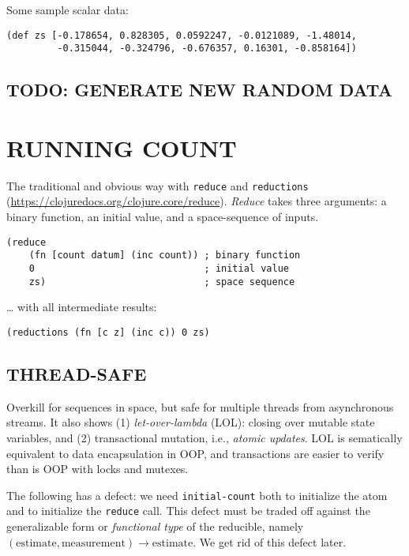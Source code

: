 \documentclass[10pt,oneside,x11names]{article}
\begin{document}
Some sample scalar data:

\begin{verbatim}
(def zs [-0.178654, 0.828305, 0.0592247, -0.0121089, -1.48014,
         -0.315044, -0.324796, -0.676357, 0.16301, -0.858164])
\end{verbatim}

\subsection{TODO: GENERATE NEW RANDOM DATA}
\label{sec:org0cce010}

\section{RUNNING COUNT}
\label{running-count}
The traditional and obvious way with \texttt{reduce} and \texttt{reductions}
(\url{https://clojuredocs.org/clojure.core/reduce}). \emph{Reduce} takes three
arguments: a binary function, an initial value, and a space-sequence of
inputs.

\begin{verbatim}
(reduce
    (fn [count datum] (inc count)) ; binary function
    0                              ; initial value
    zs)                            ; space sequence
\end{verbatim}

\ldots{} with all intermediate results:

\begin{verbatim}
(reductions (fn [c z] (inc c)) 0 zs)
\end{verbatim}

\subsection{THREAD-SAFE}
\label{thread-safe}
Overkill for sequences in space, but safe for multiple threads from
asynchronous streams. It also shows (1) \emph{let-over-lambda} (LOL): closing
over mutable state variables, and (2) transactional mutation, i.e.,
\emph{atomic updates}. LOL is sematically equivalent to data encapsulation in
OOP, and transactions are easier to verify than is OOP with locks and
mutexes.

The following has a defect: we need \texttt{initial-count} both to initialize
the atom and to initialize the \texttt{reduce} call. This defect must be traded
off against the generalizable form or \emph{functional type} of the
reducible, namely
\((\textrm{estimate}, \textrm{measurement})\rightarrow\textrm{estimate}\).
We get rid of this defect later.
\end{document}
